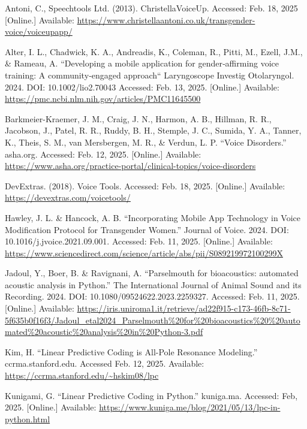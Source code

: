 \documentclass{article}
\begin{document}
%
\begin{thebibliography}{citations}
Antoni, C., Speechtools Ltd. (2013). ChristellaVoiceUp. Accessed: Feb. 18, 2025 [Online.] Available: \url{https://www.christellaantoni.co.uk/transgender-voice/voiceupapp/}

Alter, I. L., Chadwick, K. A., Andreadis, K., Coleman, R., Pitti, M., Ezell, J.M., & Rameau, A. “Developing a mobile application for gender‐affirming voice training: A community‐engaged approach“ Laryngoscope Investig Otolaryngol. 2024. DOI: 10.1002/lio2.70043 Accessed: Feb. 13, 2025. [Online.] Available: \url{https://pmc.ncbi.nlm.nih.gov/articles/PMC11645500}

Barkmeier-Kraemer, J. M., Craig, J. N., Harmon, A. B., Hillman, R. R., Jacobson, J., Patel, R. R., Ruddy, B. H., Stemple, J. C., Sumida, Y. A., Tanner, K., Theis, S. M.,  van Mersbergen, M. R., \& Verdun, L. P. “Voice Disorders.” asha.org. Accessed: Feb. 12, 2025. [Online.] Available: \url{https://www.asha.org/practice-portal/clinical-topics/voice-disorders}

DevExtras. (2018). Voice Tools. Accessed: Feb. 18, 2025. [Online.] Available: \url{https://devextras.com/voicetools/}

Hawley, J. L. \& Hancock, A. B. “Incorporating Mobile App Technology in Voice Modification Protocol for Transgender Women.” Journal of Voice. 2024. DOI: 10.1016/j.jvoice.2021.09.001. Accessed: Feb. 11, 2025. [Online.] Available:
\url{https://www.sciencedirect.com/science/article/abs/pii/S089219972100299X}

Jadoul, Y., Boer, B. \& Ravignani, A. “Parselmouth for bioacoustics: automated acoustic analysis in Python.” The International Journal of Animal Sound and its Recording. 2024. DOI: 10.1080/09524622.2023.2259327. Accessed: Feb. 11, 2025. [Online.] Available: \url{https://iris.uniroma1.it/retrieve/ad22f915-c173-46fb-8c71-5f635b0f16f3/Jadoul_etal2024_Parselmouth%20for%20bioacoustics%20%20automated%20acoustic%20analysis%20in%20Python-3.pdf}

Kim, H. “Linear Predictive Coding is All-Pole Resonance Modeling.” ccrma.stanford.edu. Accessed Feb. 12, 2025. Available: \url{https://ccrma.stanford.edu/~hskim08/lpc}

Kunigami, G. “Linear Predictive Coding in Python.” kuniga.ma. Accessed: Feb, 2025. [Online.] Available: \url{https://www.kuniga.me/blog/2021/05/13/lpc-in-python.html}


\end{thebibliography}
\end{document}
